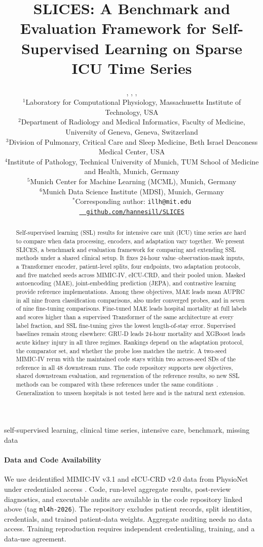 \documentclass[pmlr,twocolumn,10pt]{jmlr}
\title[SLICES: Benchmarking SSL on Sparse ICU Time Series]{SLICES: A Benchmark and Evaluation Framework for Self-Supervised Learning on Sparse ICU Time Series}
\author{%
  \centering
  \Name{Hannes Ill\nametag{$^{1,4,*}$}},
  \Name{Dimitrios Proios\nametag{$^{2}$}},
  \Name{Leo Anthony Celi\nametag{$^{1,3}$}},
  \Name{Peter J. {Sch\"uffler}\nametag{$^{4,5,6}$}}\\[2ex]
  \addr $^{1}$Laboratory for Computational Physiology, Massachusetts Institute of Technology, USA\\[0.6ex]
  \addr $^{2}$Department of Radiology and Medical Informatics, Faculty of Medicine, University of Geneva, Geneva, Switzerland\\[0.6ex]
  \addr $^{3}$Division of Pulmonary, Critical Care and Sleep Medicine, Beth Israel Deaconess Medical Center, USA\\[0.6ex]
  \addr $^{4}$Institute of Pathology, Technical University of Munich, TUM School of Medicine and Health, Munich, Germany\\[0.6ex]
  \addr $^{5}$Munich Center for Machine Learning (MCML), Munich, Germany\\[0.6ex]
  \addr $^{6}$Munich Data Science Institute (MDSI), Munich, Germany\\[0.9ex]
  \addr $^{*}$Corresponding author: \texttt{illh@mit.edu}\\[2.5ex]
  \addr \href{\releaseurl}{\faGithub\ \ \texttt{github.com/hannesill/SLICES}}\endgraf
}
\newcommand{\SLICES}{SLICES}
\newcommand{\MIMIC}{MIMIC-IV}
\newcommand{\EICU}{eICU-CRD}
\newcommand{\MAE}{MAE}
\newcommand{\JEPA}{JEPA}
\newcommand{\releaseurl}{https://github.com/hannesill/SLICES/tree/ml4h-2026}
\begin{document}
\maketitle

\begin{abstract}
Self-supervised learning (SSL) results for intensive care unit (ICU) time series are hard to compare when data processing, encoders, and adaptation vary together. We present \SLICES{}, a benchmark and evaluation framework for comparing and extending SSL methods under a shared clinical setup. It fixes 24-hour value--observation-mask inputs, a Transformer encoder, patient-level splits, four endpoints, two adaptation protocols, and five matched seeds across \MIMIC{}, \EICU{}, and their pooled union. Masked autoencoding (\MAE{}), joint-embedding prediction (\JEPA{}), and contrastive learning provide reference implementations. Among these objectives, \MAE{} leads mean AUPRC in all nine frozen classification comparisons, also under converged probes, and in seven of nine fine-tuning comparisons. Fine-tuned \MAE{} leads hospital mortality at full labels and scores higher than a supervised Transformer of the same architecture at every label fraction, and SSL fine-tuning gives the lowest length-of-stay error. Supervised baselines remain strong elsewhere: GRU-D leads 24-hour mortality and XGBoost leads acute kidney injury in all three regimes. Rankings depend on the adaptation protocol, the comparator set, and whether the probe loss matches the metric. A two-seed \MIMIC{} rerun with the maintained code stays within two across-seed SDs of the reference in all 48 downstream runs. The code repository supports new objectives, shared downstream evaluation, and regeneration of the reference results, so new SSL methods can be compared with these references under the same conditions~\href{\releaseurl}{\faGithub}. Generalization to unseen hospitals is not tested here and is the natural next extension.
\end{abstract}

\begin{keywords}
self-supervised learning, clinical time series, intensive care, benchmark, missing data
\end{keywords}

\ifmlhneedsstatements
\paragraph*{Data and Code Availability}
We use deidentified \MIMIC{} v3.1 and \EICU{} v2.0 data from PhysioNet under credentialed access \citep{physionet2024mimiciv31,physionet2019eicu20}. Code, run-level aggregate results, post-review diagnostics, and executable audits are available in the code repository linked above (tag \texttt{ml4h-2026}). The repository excludes patient records, split identities, credentials, and trained patient-data weights. Aggregate auditing needs no data access. Training reproduction requires independent credentialing, training, and a data-use agreement.
\end{document}
